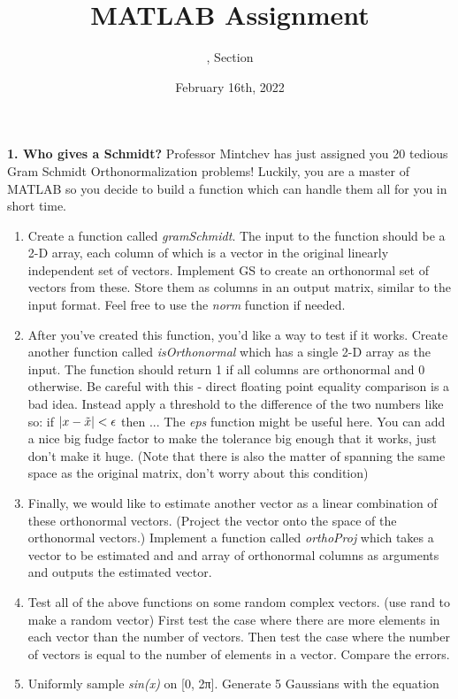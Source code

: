 \documentclass[11pt]{article}
\title{MATLAB Assignment \Homework}
\author{\Session, Section \Section}
\date{February 16th, 2022}
\newenvironment{qparts}{\begin{enumerate}[{(}a{)}]}{\end{enumerate}}
\begin{document}
\maketitle

 \noindent \textbf{1. Who gives a Schmidt?} Professor Mintchev has just assigned you 20 tedious Gram Schmidt Orthonormalization problems! Luckily, you are a master of MATLAB so you decide to build a function which can handle them all for you in short time.
 \begin{qparts}
  \item Create a function called \emph{gramSchmidt}. The input to the function should be a 2-D array, each column of which is a vector in the original linearly independent set of vectors. Implement GS to create an orthonormal set of vectors from these. Store them as columns in an output matrix, similar to the input format. Feel free to use the \emph{norm} function if needed.
  \item After you’ve created this function, you’d like a way to test if it works. Create another function called \emph{isOrthonormal} which has a single 2-D array as the input. The function should return 1 if all columns are orthonormal and 0 otherwise. Be careful with this - direct floating point equality comparison is a bad idea. Instead apply a threshold to the difference of the two numbers like so: if $|x-\Tilde{x}| < \epsilon $ then ... The \emph{eps} function might be useful here. You can add a nice big fudge factor to make the tolerance big enough that it works, just don’t make it huge. (Note that there is also the matter of spanning the same space as the original matrix, don’t worry about this condition)
  \item Finally, we would like to estimate another vector as a linear combination of these orthonormal vectors. (Project the vector onto the space of the orthonormal vectors.) Implement a function called \emph{orthoProj} which takes a vector to be estimated and and array of orthonormal columns as arguments and outputs the estimated vector.
  \item Test all of the above functions on some random complex vectors. (use rand to make a random vector) First test the case where there are more elements in each vector than the number of vectors. Then test the case where the number of vectors is equal to the number of elements in a vector. Compare the errors.
  \item Uniformly sample \emph{sin(x)} on [0, 2π]. Generate 5 Gaussians with the equation
  

\end{qparts}
\end{document}
